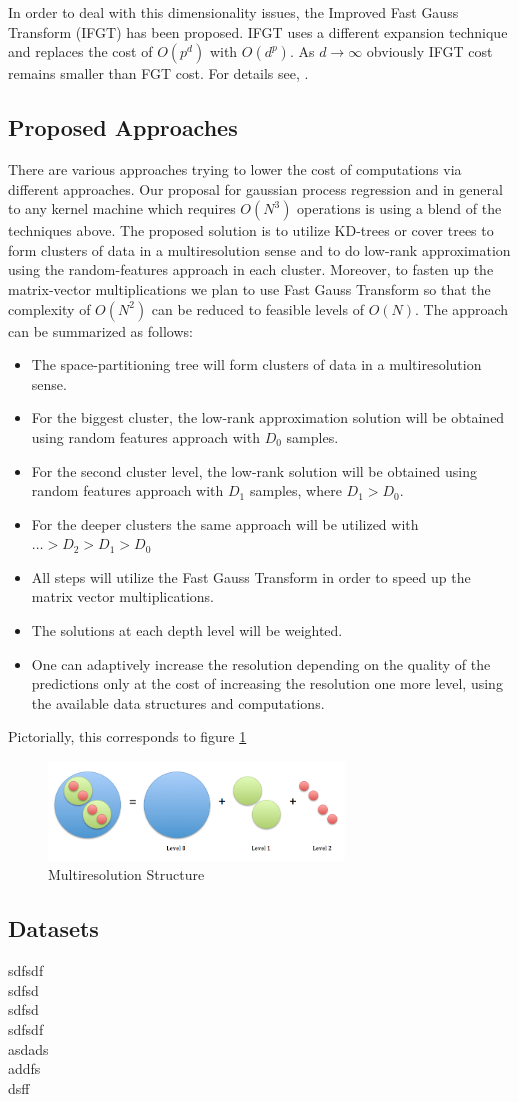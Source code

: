\documentclass{article}
\begin{document}
In order to deal with this dimensionality issues, the Improved Fast Gauss Transform (IFGT) has  been proposed. IFGT uses a different expansion technique and replaces the cost of $O(p^d)$ with $O(d^p)$. As $d\rightarrow \infty$ obviously IFGT cost remains smaller than FGT cost. For details see, \cite{FGTkernel}.
\subsection{Proposed Approaches}
There are various approaches trying to lower the cost of computations via different approaches. Our proposal for gaussian process regression and in general to any kernel machine which requires $O(N^3)$ operations is using a blend of the techniques above. The proposed solution is to utilize KD-trees or cover trees to form clusters of data in a multiresolution sense and to do low-rank approximation using the random-features approach in each cluster. Moreover, to fasten up the matrix-vector multiplications we plan to use Fast Gauss Transform so that the complexity of $O(N^2)$ can be reduced to feasible levels of $O(N)$. The approach can be summarized as follows:
\begin{itemize}
\item The space-partitioning tree will form clusters of data in a multiresolution sense.
\item For the biggest cluster, the low-rank approximation solution will be obtained using random features approach with $D_0$ samples.
\item For the second cluster level, the low-rank solution will be obtained using random features approach with $D_1$ samples, where $D_1>D_0$.
\item For the deeper clusters the same approach will be utilized with $\dots>D_2>D_1>D_0$
\item All steps will utilize the Fast Gauss Transform in order to speed up the matrix vector multiplications.
\item The solutions at each depth level will be weighted.
\item One can adaptively increase the resolution depending on the quality of the predictions only at the cost of increasing the resolution one more level, using the available data structures and computations.
\end{itemize}
Pictorially, this corresponds to figure \ref{fig:multiresolution}
\begin{figure}[h!] \label{fig:multiresolution}
  \caption{Multiresolution Structure}
  \centering
    \includegraphics[width=0.7\textwidth]{multiresolution}
\end{figure}
\subsection{Datasets}
sdfsdf \\
sdfsd\\
sdfsd\\
sdfsdf\\
asdads\\
addfs\\
dsff\\


\newpage


\end{document}
